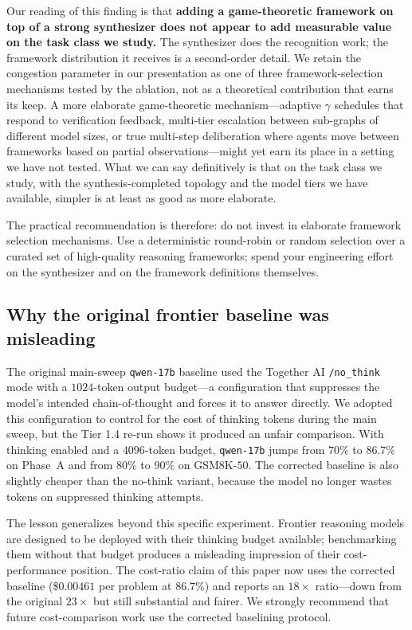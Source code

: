 \documentclass[11pt]{amsart}
\newcommand{\g}{\gamma}
\newcommand\1{{\mathds{1}}}
\theoremstyle{definition}
\theoremstyle{remark}
\numberwithin{equation}{section}
\begin{document}
Our reading of this finding is that \textbf{adding a game-theoretic framework on top of a strong synthesizer does not appear to add measurable value on the task class we study.}
The synthesizer does the recognition work; the framework distribution it receives is a second-order detail.
We retain the congestion parameter in our presentation as one of three framework-selection mechanisms tested by the ablation, not as a theoretical contribution that earns its keep.
A more elaborate game-theoretic mechanism---adaptive $\g$ schedules that respond to verification feedback, multi-tier escalation between sub-graphs of different model sizes, or true multi-step deliberation where agents move between frameworks based on partial observations---might yet earn its place in a setting we have not tested.
What we can say definitively is that on the task class we study, with the synthesis-completed topology and the model tiers we have available, simpler is at least as good as more elaborate.

The practical recommendation is therefore: do not invest in elaborate framework selection mechanisms. Use a deterministic round-robin or random selection over a curated set of high-quality reasoning frameworks; spend your engineering effort on the synthesizer and on the framework definitions themselves.

\subsection{Why the original frontier baseline was misleading}\label{sec:frontier}

The original main-sweep \texttt{qwen-17b} baseline used the Together AI \texttt{/no\_think} mode with a $1024$-token output budget---a configuration that suppresses the model's intended chain-of-thought and forces it to answer directly.
We adopted this configuration to control for the cost of thinking tokens during the main sweep, but the Tier 1.4 re-run shows it produced an unfair comparison.
With thinking enabled and a $4096$-token budget, \texttt{qwen-17b} jumps from $70\%$ to $86.7\%$ on Phase~A and from $80\%$ to $90\%$ on GSM8K-$50$.
The corrected baseline is also slightly cheaper than the no-think variant, because the model no longer wastes tokens on suppressed thinking attempts.

The lesson generalizes beyond this specific experiment.
Frontier reasoning models are designed to be deployed with their thinking budget available; benchmarking them without that budget produces a misleading impression of their cost-performance position.
The cost-ratio claim of this paper now uses the corrected baseline (\$$0.00461$ per problem at $86.7\%$) and reports an $18\times$ ratio---down from the original $23\times$ but still substantial and fairer.
We strongly recommend that future cost-comparison work use the corrected baselining protocol.
\end{document}
